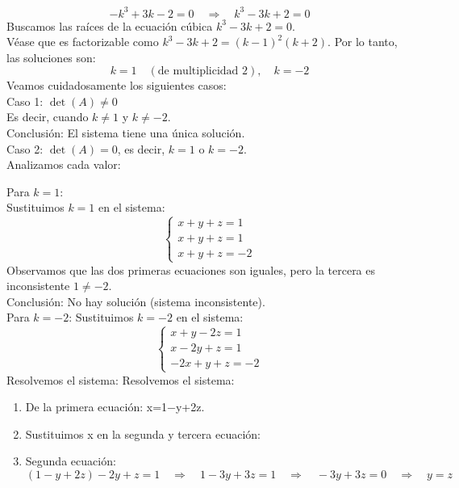 \begin{solution}
\[
-k^3 + 3k - 2 = 0 \quad \Rightarrow \quad k^3 - 3k + 2 = 0
\]
Buscamos las raíces de la ecuación cúbica \( k^3 - 3k + 2 = 0 \). \\
Véase que es factorizable como $ k^3 - 3k + 2 = (k - 1)^2 (k + 2) $. Por lo tanto, las soluciones son:
\[
k = 1 \quad (\text{de multiplicidad 2}), \quad k = -2
\]
Veamos cuidadosamente los siguientes casos: \\
Caso 1: \( \det(A) \neq 0 \) \\
Es decir, cuando \( k \neq 1 \) y \( k \neq -2 \). \\
Conclusión: El sistema tiene una única solución. \\


Caso 2: \( \det(A) = 0 \), es decir, \( k = 1 \) o \( k = -2 \). \\
Analizamos cada valor:


Para $k=1$: \\
Sustituimos $k=1$ en el sistema:
\[
     \begin{cases}
     x + y + z = 1 \\
     x + y + z = 1 \\
     x + y + z = -2
     \end{cases}
     \]
Observamos que las dos primeras ecuaciones son iguales, pero la tercera es inconsistente \( 1 \neq -2 \). \\
Conclusión: No hay solución (sistema inconsistente). \\


Para \( k = -2 \):
Sustituimos $k=−2$ en el sistema:
\[
     \begin{cases}
     x + y - 2z = 1 \\
     x - 2y + z = 1 \\
     -2x + y + z = -2
     \end{cases}
     \]Resolvemos el sistema:
Resolvemos el sistema:
\begin{enumerate}
    \item De la primera ecuación: x=1−y+2z.
    \item Sustituimos x en la segunda y tercera ecuación:
    \item Segunda ecuación:
\[
          (1 - y + 2z) - 2y + z = 1 \quad \Rightarrow \quad 1 - 3y + 3z = 1 \quad \Rightarrow \quad -3y + 3z = 0 \quad \Rightarrow \quad y = z
          \]



\end{enumerate}
\end{solution}
